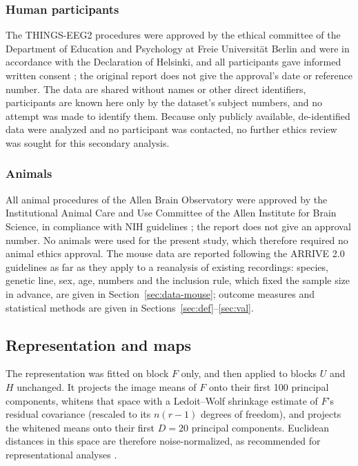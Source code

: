 \documentclass[11pt]{article}
\begin{document}
\subsubsection{Human participants}
The THINGS-EEG2 procedures were approved by the ethical committee of the Department of Education and Psychology at Freie Universit\"at Berlin and were in accordance with the Declaration of Helsinki, and all participants gave informed written consent \citep{gifford2022}; the original report does not give the approval's date or reference number.
The data are shared without names or other direct identifiers, participants are known here only by the dataset's subject numbers, and no attempt was made to identify them.
Because only publicly available, de-identified data were analyzed and no participant was contacted, no further ethics review was sought for this secondary analysis.

\subsubsection{Animals}
All animal procedures of the Allen Brain Observatory were approved by the Institutional Animal Care and Use Committee of the Allen Institute for Brain Science, in compliance with NIH guidelines \citep{devries2020}; the report does not give an approval number.
No animals were used for the present study, which therefore required no animal ethics approval.
The mouse data are reported following the ARRIVE 2.0 guidelines \citep{percie2020} as far as they apply to a reanalysis of existing recordings: species, genetic line, sex, age, numbers and the inclusion rule, which fixed the sample size in advance, are given in Section~\ref{sec:data-mouse}; outcome measures and statistical methods are given in Sections~\ref{sec:def}--\ref{sec:val}.

\subsection{Representation and maps}\label{sec:rep}

The representation was fitted on block $F$ only, and then applied to blocks $U$ and $H$ unchanged.
It projects the image means of $F$ onto their first 100 principal components, whitens that space with a Ledoit--Wolf shrinkage estimate \citep{ledoit2004} of $F$'s residual covariance (rescaled to its $n(r-1)$ degrees of freedom), and projects the whitened means onto their first $D=20$ principal components.
Euclidean distances in this space are therefore noise-normalized, as recommended for representational analyses \citep{walther2016,guggenmos2018}.
\end{document}
